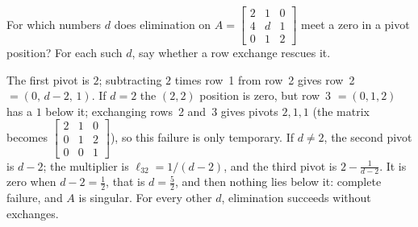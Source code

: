 \begin{exercise}\label{ex:u03-fail}
For which numbers $d$ does elimination on
$A=\begin{bmatrix} 2&1&0\\ 4&d&1\\ 0&1&2\end{bmatrix}$ meet a zero in a pivot position? For
each such $d$, say whether a row exchange rescues it.
\end{exercise}
\begin{solution}
The first pivot is $2$; subtracting $2$ times row~1 from row~2 gives row~2 $=(0,\,d-2,\,1)$.
If $d=2$ the $(2,2)$ position is zero, but row~3 $=(0,1,2)$ has a $1$ below it; exchanging
rows~2 and~3 gives pivots $2,1,1$ (the matrix becomes $\begin{bmatrix}2&1&0\\0&1&2\\0&0&1\end{bmatrix}$),
so this failure is only temporary. If $d\neq2$, the second pivot is $d-2$; the multiplier is
$\ell_{32}=1/(d-2)$, and the third pivot is $2-\frac{1}{d-2}$. It is zero when $d-2=\tfrac12$,
that is $d=\tfrac52$, and then nothing lies below it: complete failure, and $A$ is singular.
For every other $d$, elimination succeeds without exchanges.
\end{solution}
